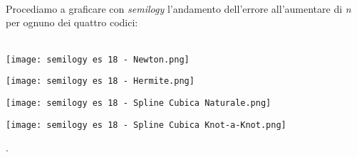 \documentclass[a4paper]{report}
\begin{document}
\\\\\\Procediamo a graficare con \emph{semilogy} l'andamento dell'errore all'aumentare di \emph{n} per ognuno dei quattro codici:\\\\
\begin{center}	%
	\texttt{[image: semilogy es 18 - Newton.png]}
\end{center}
\begin{center}	%
	\newpage \texttt{[image: semilogy es 18 - Hermite.png]}
\end{center}
\begin{center}	%
	\texttt{[image: semilogy es 18 - Spline Cubica Naturale.png]}
\end{center}
\begin{center}	%
	\newpage \texttt{[image: semilogy es 18 - Spline Cubica Knot-a-Knot.png]}
\end{center}
.\\
\end{document}
